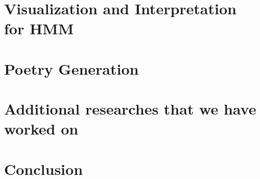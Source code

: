\section{Visualization and Interpretation for HMM}\label{sec:visualization}


\section{Poetry Generation}


\section{Additional researches that we have worked on}




%

\section{Conclusion}



